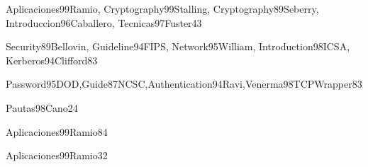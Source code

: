 \begin{syllabus}
\begin{unit}{\ALCryptographicAlgorithmsDef}{Aplicaciones99Ramio, Cryptography99Stalling, Cryptography89Seberry, Introduccion96Caballero, Tecnicas97Fuster}{4}{3}
    \ALCryptographicAlgorithmsAllTopics
    \ALCryptographicAlgorithmsAllObjectives
\end{unit}

\begin{unit}{\NCNetworkSecurityDef}{Security89Bellovin, Guideline94FIPS, Network95William, Introduction98ICSA, Kerberos94Clifford}{8}{3}
    \NCNetworkSecurityAllTopics
    \NCNetworkSecurityAllObjectives
\end{unit}

\begin{unit}{\NCNetworkManagementDef}{Password95DOD,Guide87NCSC,Authentication94Ravi,Venerma98TCPWrapper}{8}{3}
    \NCNetworkManagementAllTopics
    \NCNetworkManagementAllObjectives
\end{unit}

\begin{unit}{\HCHumanFactorsAndSecurityDef}{Pautas98Cano}{2}{4}
    \HCHumanFactorsAndSecurityAllTopics
    \HCHumanFactorsAndSecurityAllObjectives
\end{unit}

\begin{unit}{\SPSecurityOperationsDef}{Aplicaciones99Ramio}{8}{4}
    \SPSecurityOperationsAllTopics
    \SPSecurityOperationsAllObjectives
\end{unit}

\begin{unit}{\PLVirtualMachinesDef}{Aplicaciones99Ramio}{3}{2}
\begin{topics}
    \item \PLVirtualMachinesTopicSecurity
\end{topics}

\begin{unitgoals}
    \item \PLVirtualMachinesObjFOUR
\end{unitgoals}
\end{unit}



\begin{coursebibliography}
\end{coursebibliography}

\end{syllabus}
